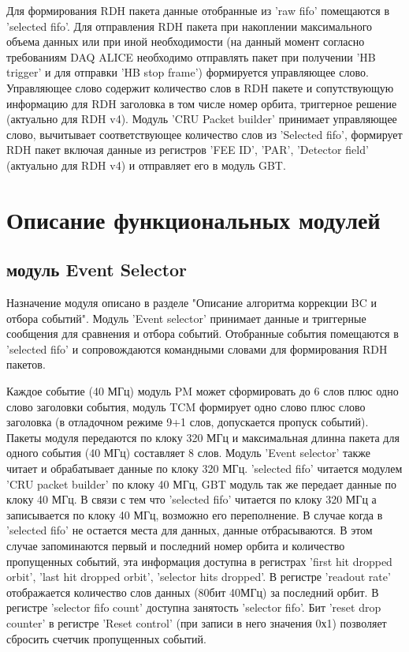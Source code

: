 \documentclass{article}
\begin{document}
Для формирования RDH пакета данные отобранные из 'raw fifo' помещаются в 'selected fifo'. Для отправления RDH пакета при накоплении максимального объема данных или при иной необходимости (на данный момент согласно требованиям DAQ ALICE необходимо отправлять пакет при получении 'HB trigger' и для отправки 'HB stop frame') формируется управляющее слово. Управляющее слово содержит количество слов в RDH пакете и сопутствующую информацию для RDH заголовка в том числе номер орбита, триггерное решение (актуально для RDH v4). Модуль 'CRU Packet builder' принимает управляющее слово, вычитывает соответствующее количество слов из 'Selected fifo', формирует RDH пакет включая данные из регистров 'FEE ID', 'PAR', 'Detector field' (актуально для RDH v4) и отправляет его в модуль GBT.




\section{Описание функциональных модулей}
\subsection{модуль Event Selector}
Назначение модуля описано в разделе "Описание алгоритма коррекции BC и отбора событий". Модуль 'Event selector' принимает данные и триггерные сообщения для сравнения и отбора событий. Отобранные события помещаются в 'selected fifo' и сопровождаются командными словами для формирования RDH пакетов.

Каждое событие (40 МГц) модуль PM может сформировать до 6 слов плюс одно слово заголовки события, модуль TCM формирует одно слово плюс слово заголовка (в отладочном режиме 9+1 слов, допускается пропуск событий). Пакеты модуля передаются по клоку 320 МГц и максимальная длинна пакета для одного события (40 МГц) составляет 8 слов. Модуль 'Event selector' также читает и обрабатывает данные по клоку 320 МГц. 'selected fifo' читается модулем 'CRU packet builder' по клоку 40 МГц, GBT модуль так же передает данные по клоку 40 МГц. В связи с тем что 'selected fifo' читается по клоку 320 МГц а записывается по клоку 40 МГц, возможно его переполнение. В случае когда в 'selected fifo' не остается места для данных, данные отбрасываются. В этом случае запоминаются первый и последний номер орбита и количество пропущенных событий, эта информация доступна в регистрах 'first hit dropped orbit', 'last hit dropped orbit', 'selector hits dropped'. В регистре 'readout rate' отображается количество слов данных (80бит 40МГц) за последний орбит. В регистре 'selector fifo count' доступна занятость 'selector fifo'. Бит 'reset drop counter' в регистре 'Reset control' (при записи в него значения 0х1) позволяет сбросить счетчик пропущенных событий.
\end{document}
